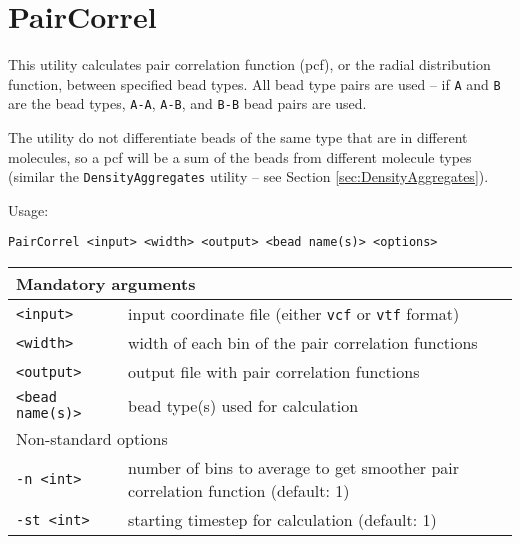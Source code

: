 \section{PairCorrel} \label{sec:PairCorrel}

This utility calculates pair correlation function (pcf), or the radial
distribution function, between specified bead types. All bead type pairs
are used -- if \texttt{A} and \texttt{B} are the bead types, \texttt{A-A},
\texttt{A-B}, and \texttt{B-B} bead pairs are used.

The utility do not differentiate beads of the same type that are in
different molecules, so a pcf will be a sum of the beads from different
molecule types (similar the \texttt{DensityAggregates} utility -- see
Section \ref{sec:DensityAggregates}).

Usage:

\vspace{1em}
\noindent
\texttt{PairCorrel <input> <width> <output> <bead name(s)> <options>}

\noindent
\begin{longtable}{p{}p{}}
  \toprule
  \multicolumn{2}{l}{Mandatory arguments} \\
  \midrule
  \texttt{<input>} & input coordinate file (either \texttt{vcf} or
    \texttt{vtf} format) \\
  \texttt{<width>} & width of each bin of the pair correlation functions \\
  \texttt{<output>} & output file with pair correlation functions \\
  \texttt{<bead name(s)>} & bead type(s) used for calculation \\
  \toprule
  \multicolumn{2}{l}{Non-standard options} \\
  \midrule
  \texttt{-n <int>} & number of bins to average to get smoother pair
    correlation function (default: 1) \\
  \texttt{-st <int>} & starting timestep for calculation (default: 1) \\
  \bottomrule
\end{longtable}

